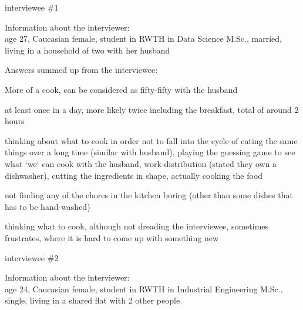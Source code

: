 \documentclass[a4paper,11pt,oneside]{scrreprt}
\begin{document}
		\begin{compactitem}
			\item interviewee \#1	
				\begin{compactitem}
					\item Information about the interviewer: \\
					age 27, Caucasian female, student in RWTH in Data Science M.Sc., married, living in a household of two with her husband\\
					
					\item Answers summed up from the interviewee:
						\begin{compactenum}
							\item More of a cook, can be considered as fifty-fifty with the husband
							\item at least once in a day, more likely twice including the breakfast, total of around 2 hours
							\item thinking about what to cook in order not to fall into the cycle of eating the same things over a long time (similar with husband), playing the guessing game to see what `we` can cook with the husband, work-distribution (stated they own a dishwasher), cutting the ingredients in shape, actually cooking the food
							\item not finding any of the chores in the kitchen boring (other than some dishes that has to be hand-washed)
							\item thinking what to cook, although not dreading the interviewee, sometimes frustrates, where it is hard to come up with something new
						\end{compactenum}
					
					
				\end{compactitem}
			
			\bigskip
			
			\item interviewee \#2
			\begin{compactitem}
				\item Information about the interviewer: \\
				age 24, Caucasian female, student in RWTH in Industrial Engineering M.Sc., single, living in a shared flat with 2 other people
				

\end{compactitem}
\end{compactitem}
\end{document}
